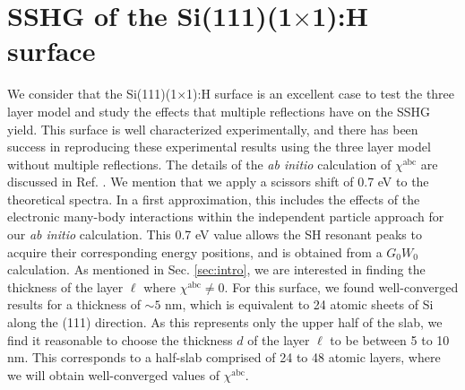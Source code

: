 \documentclass[aps,prb,10pt,showpacs,letterpaper,twocolumn]{revtex4-1}
\begin{document}

\section{SSHG of the
\texorpdfstring{S\lowercase{i}(111)(1$\times$1):H}{Si(111)(1x1):H} surface}
\label{sec:example} 

We consider that the Si(111)(1$\times$1):H surface is an excellent case to test
the three layer model and study the effects that multiple reflections have on
the SSHG yield. This surface is well characterized
experimentally,\cite{mitchellSS01, mejiaPRB02, bergfeldPRL04} and there has been
success in reproducing these experimental results using the three layer model
without multiple reflections.\cite{andersonPRB16} The details of the \emph{ab
initio} calculation of $\chi^{\mathrm{abc}}$ are discussed in Ref.
. We mention that we apply a scissors shift of 0.7 eV
to the theoretical spectra. In a first approximation, this includes the effects
of the electronic many-body interactions within the independent particle
approach for our \emph{ab initio} calculation. This 0.7 eV value allows the SH
resonant peaks to acquire their corresponding energy positions, and is obtained
from a $G_{0}W_{0}$ calculation.\cite{andersonPRB16, liPRB10} As mentioned in
Sec. \ref{sec:intro}, we are interested in finding the thickness of the layer
$\ell$ where $\chi^{\mathrm{abc}} \ne 0$. For this surface, we found
well-converged results for a thickness of $\sim 5$ nm, which is equivalent to 24
atomic sheets of Si along the (111) direction. As this represents only the upper
half of the slab, we find it reasonable to choose the thickness $d$ of the layer
$\ell$ to be between 5 to 10 nm. This corresponds to a half-slab comprised of 24
to 48 atomic layers, where we will obtain well-converged values of
$\chi^{\mathrm{abc}}$.
\end{document}
